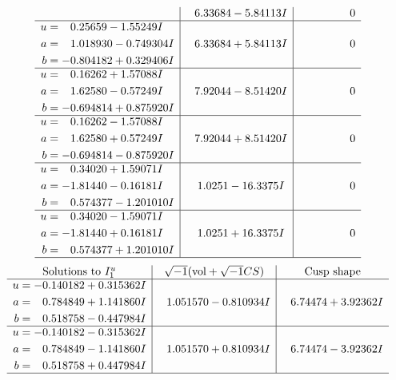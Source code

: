 \documentclass[1p]{elsarticle_modified}
\theoremstyle{definition}
\newcommand{\I}{\sqrt{-1}}
\begin{document}
$$\begin{array}{c|c|c}
 & \phantom{-}6.33684 - 5.84113 I & \phantom{-0.000000 } 0 \\ \hline\begin{aligned}
u &= \phantom{-}0.25659 - 1.55249 I \\
a &= \phantom{-}1.018930 - 0.749304 I \\
b &= -0.804182 + 0.329406 I\end{aligned}
 & \phantom{-}6.33684 + 5.84113 I & \phantom{-0.000000 } 0 \\ \hline\begin{aligned}
u &= \phantom{-}0.16262 + 1.57088 I \\
a &= \phantom{-}1.62580 - 0.57249 I \\
b &= -0.694814 + 0.875920 I\end{aligned}
 & \phantom{-}7.92044 - 8.51420 I & \phantom{-0.000000 } 0 \\ \hline\begin{aligned}
u &= \phantom{-}0.16262 - 1.57088 I \\
a &= \phantom{-}1.62580 + 0.57249 I \\
b &= -0.694814 - 0.875920 I\end{aligned}
 & \phantom{-}7.92044 + 8.51420 I & \phantom{-0.000000 } 0 \\ \hline\begin{aligned}
u &= \phantom{-}0.34020 + 1.59071 I \\
a &= -1.81440 - 0.16181 I \\
b &= \phantom{-}0.574377 - 1.201010 I\end{aligned}
 & \phantom{-}1.0251 - 16.3375 I & \phantom{-0.000000 } 0 \\ \hline\begin{aligned}
u &= \phantom{-}0.34020 - 1.59071 I \\
a &= -1.81440 + 0.16181 I \\
b &= \phantom{-}0.574377 + 1.201010 I\end{aligned}
 & \phantom{-}1.0251 + 16.3375 I & \phantom{-0.000000 } 0\\
 \hline 
 \end{array}$$\newpage$$\begin{array}{c|c|c}  
\text{Solutions to }I^u_{1}& \I (\text{vol} + \sqrt{-1}CS) & \text{Cusp shape}\\
 \hline 
\begin{aligned}
u &= -0.140182 + 0.315362 I \\
a &= \phantom{-}0.784849 + 1.141860 I \\
b &= \phantom{-}0.518758 - 0.447984 I\end{aligned}
 & \phantom{-}1.051570 - 0.810934 I & \phantom{-}6.74474 + 3.92362 I \\ \hline\begin{aligned}
u &= -0.140182 - 0.315362 I \\
a &= \phantom{-}0.784849 - 1.141860 I \\
b &= \phantom{-}0.518758 + 0.447984 I\end{aligned}
 & \phantom{-}1.051570 + 0.810934 I & \phantom{-}6.74474 - 3.92362 I\\
 \hline 
 \end{array}$$\newpage\newpage\renewcommand{\arraystretch}{1}
\end{document}
